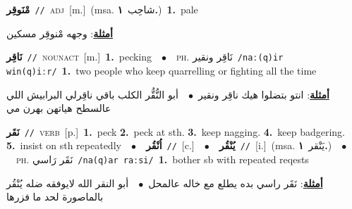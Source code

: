 \documentclass[10pt,a4paper,twoside]{article} %
\begin{document}
\begin{multicols}{2}
{\setlength\topsep{0pt}\textbf{\foreignlanguage{arabic}{مْنَوقِر}}\ {\color{gray}\texttt{//}\color{black}}\ \textsc{adj}\ [m.]\ \color{gray}(msa. \foreignlanguage{arabic}{شاحِب}~\foreignlanguage{arabic}{\textbf{١.}})\color{black}\ \textbf{1.}~pale\  \begin{flushright}\color{gray}\foreignlanguage{arabic}{\textbf{\underline{\foreignlanguage{arabic}{أمثلة}}}: وجهه مْنوقِر مسكين}\end{flushright}\color{black}} \vspace{2mm}

{\setlength\topsep{0pt}\textbf{\foreignlanguage{arabic}{نَاقِر}}\ {\color{gray}\texttt{//}\color{black}}\ \textsc{noun\textunderscore act}\ [m.]\ \textbf{1.}~pecking\ \ $\bullet$\ \ \textsc{ph.} \color{gray} \foreignlanguage{arabic}{نَاقِر ونقير}\color{black}\ {\color{gray}\texttt{/{\sffamily naː(q)ir win(q)iːr}/}\color{black}}\ \textbf{1.}~two people who keep quarrelling or fighting all the time\  \begin{flushright}\color{gray}\foreignlanguage{arabic}{\textbf{\underline{\foreignlanguage{arabic}{أمثلة}}}: انتو بتضلوا هيك ناقِر ونقير\ $\bullet$\ \  أبو النُّقُّر الكلب باقي ناقِرلي البرابيش اللي عالسطح هياتهن بهرن مي}\end{flushright}\color{black}} \vspace{2mm}

{\setlength\topsep{0pt}\textbf{\foreignlanguage{arabic}{نَقَر}}\ {\color{gray}\texttt{//}\color{black}}\ \textsc{verb}\ [p.]\ \textbf{1.}~peck  \textbf{2.}~peck at sth.  \textbf{3.}~keep nagging.  \textbf{4.}~keep badgering.  \textbf{5.}~insist on sth repeatedly\ \ $\bullet$\ \ \setlength\topsep{0pt}\textbf{\foreignlanguage{arabic}{اُنْقُر}}\ {\color{gray}\texttt{//}\color{black}}\ [c.]\ \ $\bullet$\ \ \setlength\topsep{0pt}\textbf{\foreignlanguage{arabic}{يُنْقُر}}\ {\color{gray}\texttt{//}\color{black}}\ [i.]\ \color{gray}(msa. \foreignlanguage{arabic}{يَنْقر}~\foreignlanguage{arabic}{\textbf{١.}})\color{black}\ \ $\bullet$\ \ \textsc{ph.} \color{gray} \foreignlanguage{arabic}{نَقَر رَاسي}\color{black}\ {\color{gray}\texttt{/{\sffamily na(q)ar raːsi}/}\color{black}}\ \textbf{1.}~bother sb with repeated reqests\  \begin{flushright}\color{gray}\foreignlanguage{arabic}{\textbf{\underline{\foreignlanguage{arabic}{أمثلة}}}: نَقَر راسي بده يطلع مع خاله عالمحل\ $\bullet$\ \  أبو النقر الله لايوفقه ضله يُنْقُر بالماصورة لحد ما فزرها}\end{flushright}\color{black}} \vspace{2mm}


\end{multicols}
\end{document}
